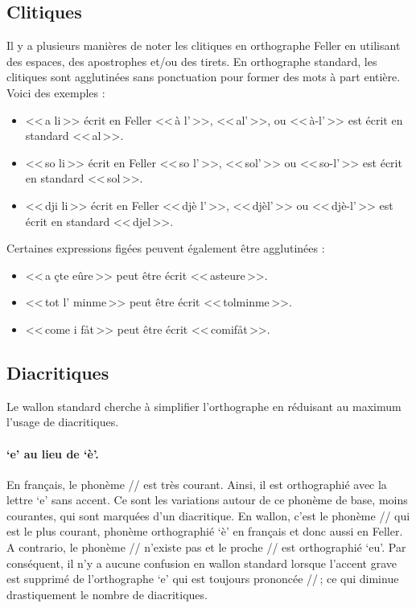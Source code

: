\documentclass[french]{article}
\begin{document}
\subsection{Clitiques}

Il y a plusieurs manières de noter les clitiques en orthographe Feller en utilisant des espaces, des apostrophes et/ou des tirets. En orthographe standard, les clitiques sont agglutinées sans ponctuation pour former des mots à part entière. Voici des exemples :
\begin{itemize}
	\item <<\,a li\,>> écrit en Feller <<\,à l'\,>>,  <<\,al'\,>>, ou <<\,à-l'\,>> est écrit en standard <<\,al\,>>.
	\item <<\,so li\,>> écrit en Feller <<\,so l'\,>>, <<\,sol'\,>> ou <<\,so-l'\,>> est écrit en standard <<\,sol\,>>.
	\item <<\,dji li\,>> écrit en Feller <<\,djè l'\,>>, <<\,djèl'\,>> ou <<\,djè-l'\,>> est écrit en standard <<\,djel\,>>.
\end{itemize}
Certaines expressions figées peuvent également être agglutinées :
\begin{itemize}
	\item <<\,a çte eûre\,>> peut être écrit <<\,asteure\,>>.
	\item <<\,tot l' minme\,>> peut être écrit <<\,tolminme\,>>.
	\item <<\,come i fåt\,>> peut être écrit <<\,comifåt\,>>.
\end{itemize}

\subsection{Diacritiques}

Le wallon standard cherche à simplifier l'orthographe en réduisant au maximum l'usage de diacritiques.

\paragraph{`e' au lieu de `è'.} En français, le phonème // est très courant. Ainsi, il est orthographié avec la lettre `e' sans accent. Ce sont les variations autour de ce phonème de base, moins courantes, qui sont marquées d'un diacritique. En wallon, c'est le phonème // qui est le plus courant, phonème orthographié `è' en français et donc aussi en Feller. A contrario, le phonème // n'existe pas et le proche /\textipa{\oe}/ est orthographié `eu'. Par conséquent, il n'y a aucune confusion en wallon standard lorsque l'accent grave est supprimé de l'orthographe `e' qui est toujours prononcée //\,; ce qui diminue drastiquement le nombre de diacritiques.
\end{document}
